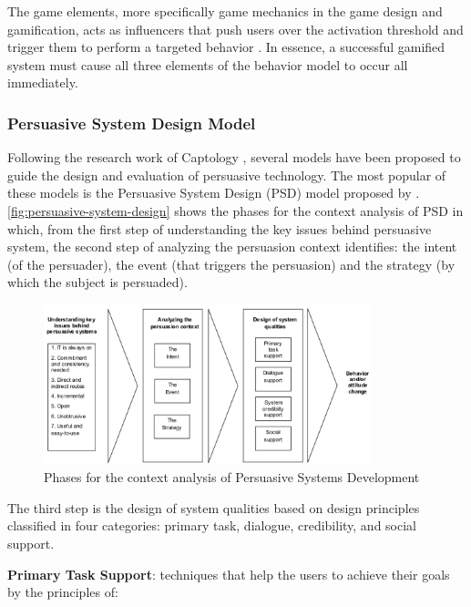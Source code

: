 The game elements, more specifically game mechanics in the game design and gamification, acts as influencers that push users over the activation threshold and trigger them to perform a targeted behavior \cite{Wu2011}.
In essence, a successful gamified system must cause all three elements of the behavior model to occur all immediately.

\subsubsection{Persuasive System Design Model}
\label{subsubsec:psd-model}

Following the research work of Captology \cite{Fogg2002}, several models have been proposed to guide the design and evaluation of persuasive technology.
The most popular of these models is the Persuasive System Design (PSD) model proposed by . \autoref{fig:persuasive-system-design} shows the phases for the context analysis of PSD in which, from the first step of understanding the key issues behind persuasive system, the second step of analyzing the persuasion context identifies: the intent (of the persuader), the event (that triggers the persuasion) and the strategy (by which the subject is persuaded).

\begin{figure}[htb]
 \caption{Phases for the context analysis of Persuasive Systems Development}
 \label{fig:persuasive-system-design}
 \centering
 \includegraphics[width=0.85\textwidth]{images/chap-general-background/persuasive-system-design.png}
\end{figure}

The third step is the design of system qualities based on design principles classified in four categories: primary task, dialogue, credibility, and social support.

\textbf{Primary Task Support}: techniques that help the users to achieve their goals by the principles of:

